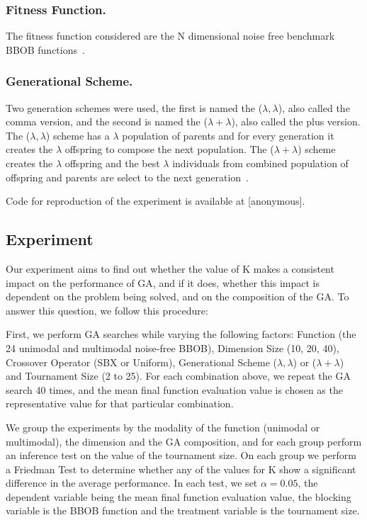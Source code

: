 \subsubsection*{Fitness Function.}
The fitness function considered are the N dimensional noise free
benchmark BBOB functions~\cite{hansen2010real}.

\subsubsection*{Generational Scheme.}
Two generation schemes were used, the first is named the ($\lambda,
\lambda$), also called the comma version, and the second is named the
($\lambda + \lambda$), also called the plus version. The ($\lambda,
\lambda$) scheme has a $\lambda$ population of parents and for every
generation it creates the $\lambda$ offspring to compose the next
population. The ($\lambda + \lambda$) scheme creates the $\lambda$
offspring and the best $\lambda$ individuals from combined population
of offspring and parents are select to the next
generation~\cite{pilat2017parallel}.

Code for reproduction of the experiment is available at [anonymous].

\subsection{Experiment}\label{sec:experiment}

Our experiment aims to find out whether the value of K makes a
consistent impact on the performance of GA, and if it does, whether
this impact is dependent on the problem being solved, and on the
composition of the GA. To answer this question, we follow this procedure:

First, we perform GA searches while varying the following factors:
Function (the 24 unimodal and multimodal noise-free BBOB), Dimension
Size (10, 20, 40), Crossover Operator (SBX or Uniform), Generational
Scheme ($\lambda, \lambda$) or ($\lambda + \lambda$) and Tournament
Size (2 to 25). For each combination above, we repeat the GA search 40
times, and the mean final function evaluation value is chosen as the
representative value for that particular combination.

We group the experiments by the modality of the function (unimodal or
multimodal), the dimension and the GA composition, and for each group
perform an inference test on the value of the tournament size. On each
group we perform a Friedman Test to determine whether any of the
values for K show a significant difference in the average
performance. In each test, we set $\alpha = 0.05$, the dependent
variable being the mean final function evaluation value, the blocking
variable is the BBOB function and the treatment variable is the
tournament size.




